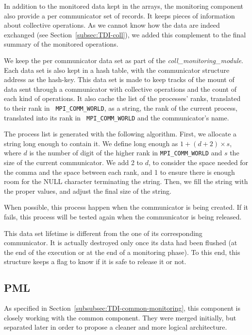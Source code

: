 \documentclass[notitlepage]{article}
\newcommand{\brkunds}[0]{\allowbreak\_}
\begin{document}
In addition to the monitored data kept in the arrays, the monitoring
component also provide a per communicator set of records. It keeps
pieces of information about collective operations. As we cannot know
how the data are indeed exchanged (see Section~\ref{subsec:TDI-coll}),
we added this complement to the final summary of the monitored
operations.

We keep the per communicator data set as part of the {\it
  coll\brkunds{}monitoring\brkunds{}module}. Each data set is also
kept in a hash table, with the communicator structure address as the
hash-key. This data set is made to keep tracks of the mount of data
sent through a communicator with collective operations and the count
of each kind of operations. It also cache the list of the processes'
ranks, translated to their rank in {\tt
  MPI\brkunds{}COMM\brkunds{}WORLD}, as a string, the rank of the
current process, translated into its rank in {\tt
  MPI\brkunds{}COMM\brkunds{}WORLD} and the communicator's name.

The process list is generated with the following algorithm. First, we
allocate a string long enough to contain it. We define long enough as
$1 + (d + 2) \times s$, where $d$ is the number of digit of the higher
rank in {\tt MPI\brkunds{}COMM\brkunds{}WORLD} and $s$ the size of the
current communicator. We add 2 to $d$, to consider the space needed
for the comma and the space between each rank, and 1 to ensure there
is enough room for the NULL character terminating the string. Then, we
fill the string with the proper values, and adjust the final size of
the string.

When possible, this process happen when the communicator is being
created. If it fails, this process will be tested again when the
communicator is being released.

This data set lifetime is different from the one of its corresponding
communicator. It is actually destroyed only once its data had been
flushed (at the end of the execution or at the end of a monitoring
phase). To this end, this structure keeps a flag to know if it is safe
to release it or not.

\subsection{PML}
\label{subsec:TDI-pml}

As specified in Section~\ref{subsubsec:TDI-common-monitoring}, this
component is closely working with the common component. They were
merged initially, but separated later in order to propose a cleaner
and more logical architecture.
\end{document}

